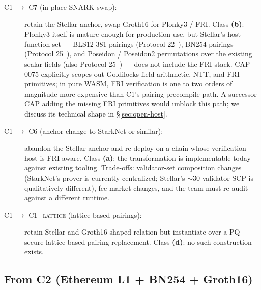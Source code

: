 \begin{description}
  \item[\textsc{C1 $\to$ C7} (in-place SNARK swap):] retain the
    Stellar anchor, swap Groth16 for Plonky3 / FRI. Class
    \textbf{(b)}: Plonky3 itself is mature enough for production
    use, but Stellar's host-function set --- BLS12-381 pairings
    (Protocol 22~\cite{stellar-cap-0059}), BN254 pairings (Protocol
    25~\cite{stellar-cap-0074}), and Poseidon / Poseidon2
    permutations over the existing scalar fields (also Protocol
    25~\cite{stellar-cap-0075}) --- does not include the FRI stack.
    CAP-0075 explicitly scopes out Goldilocks-field arithmetic, NTT,
    and FRI primitives; in pure WASM, FRI verification is one to two
    orders of magnitude more expensive than C1's pairing-precompile
    path. A successor CAP adding the missing FRI primitives would
    unblock this path; we discuss its technical shape in
    \S\ref{sec:open-host}.
  \item[\textsc{C1 $\to$ C6} (anchor change to StarkNet or similar):]
    abandon the Stellar anchor and re-deploy on a chain whose
    verification host is FRI-aware. Class \textbf{(a)}: the
    transformation is implementable today against existing tooling.
    Trade-offs: validator-set composition changes (StarkNet's prover
    is currently centralized; Stellar's $\sim$30-validator SCP is
    qualitatively different), fee market changes, and the team must
    re-audit against a different runtime.
  \item[\textsc{C1 $\to$ C1+lattice} (lattice-based pairings):]
    retain Stellar and Groth16-shaped relation but instantiate over a
    PQ-secure lattice-based pairing-replacement. Class \textbf{(d)}:
    no such construction exists.
\end{description}

\subsection{From C2 (Ethereum L1 + BN254 + Groth16)}
\label{sec:mig-c2}


